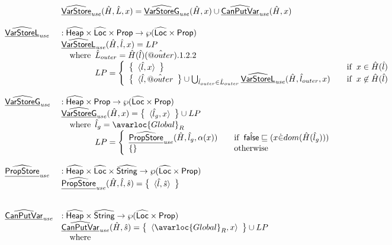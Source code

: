 \[\begin{array}{ll}
& \ahf{VarStore}_{\it use}(\hat{H}, \hat{L}, x)
= \ahf{VarStoreG}_{\it use}(\hat{H}, x) \cup \ahf{CanPutVar}_{\it use}(\hat{H},x)
\\\\
\ahf{VarStoreL}_{\it use} & : \aHeap \times \aLoc \times \SF{Prop} \rightarrow \powerset{\aLoc \times \SF{Prop}}\\
& \ahf{VarStoreL}_{\it use}(\hat{H},\hat{l},x) = LP\\
& \quad\wherec{
  \hat{L}_{outer} = \hat{H}(\hat{l})(\avarprop{outer}).1.2.2\\
  LP =
  \left\{
    \begin{array}{ll}
      \set{\langle\hat{l},x\rangle} & \quad\ifc{x\in\hat{H}(\hat{l})}\\
      \set{\langle\hat{l},\avarprop{outer}}\cup\bigcup_{\hat{l}_{outer}\in\hat{L}_{outer}}\ahf{VarStoreL}_{\it use}(\hat{H},\hat{l}_{outer},x) & \quad\ifc{x\not\in\hat{H}(\hat{l})}\\
    \end{array}
  \right.
}
\\\\
\ahf{VarStoreG}_{\it use} & : \aHeap \times \SF{Prop} \rightarrow \powerset{\aLoc \times \SF{Prop}}\\
& \ahf{VarStoreG}_{\it use}(\hat{H},x) = \set{\langle \hat{l}_g, x\rangle} \cup LP\\
& \quad\wherec{
  \hat{l}_g = \avarloc{Global}_R\\
  LP = \left\{
    \begin{array}{ll}
      \ahf{PropStore}_{\it use}(\hat{H},\hat{l}_g,\alpha(x)) & \quad\ifc{\afalse\sqsubseteq(x \dot{\in} dom(\hat{H}(\hat{l}_g)))} \\
      \set{} & \quad\owc
    \end{array}
  \right.
}
\\\\
\ahf{PropStore}_{\it use} & : \aHeap \times \aLoc \times \abs{String} \rightarrow \powerset{\aLoc \times \SF{Prop}}\\
& \ahf{PropStore}_{\it use}(\hat{H},\hat{l},\hat{s}) = \set{\langle \hat{l},\hat{s}\rangle}\\
\\\\
\ahf{CanPutVar}_{\it use} & : \aHeap \times \abs{String} \rightarrow \powerset{\aLoc \times \SF{Prop}}\\
& \ahf{CanPutVar}_{\it use}(\hat{H},\hat{s})
= \set{\langle \avarloc{Global}_R,x\rangle}\cup LP\\
& \quad\wherec{
}
\end{array}\]
